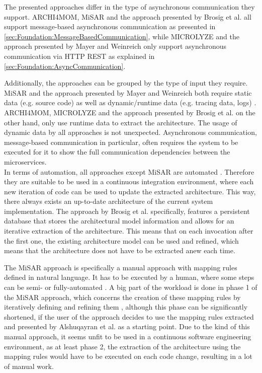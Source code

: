 The presented approaches differ in the type of asynchronous communication they support.
ARCHI4MOM, MiSAR and the approach presented by Brosig et al. all support message-based asynchronous communication as presented in \autoref{sec:Foundation:MessageBasedCommunication}, while MICROLYZE and the approach presented by Mayer and Weinreich only support asynchronous communication via HTTP REST as explained in \autoref{sec:Foundation:AsyncCommunication}.

Additionally, the approaches can be grouped by the type of input they require.
MiSAR and the approach presented by Mayer and Weinreich both require static data (e.g. source code) as well as dynamic/runtime data (e.g. tracing data, logs) \cite{Alshuqayran2018MiSAR,Mayer2018}.
ARCHI4MOM, MICROLYZE and the approach presented by Brosig et al. on the other hand, only use runtime data to extract the architecture.
The usage of dynamic data by all approaches is not unexpected.
Asynchronous communication, message-based communication in particular, often requires the system to be executed for it to show the full communication dependencies between the microservices. %
\\

In terms of automation, all approaches except MiSAR are automated \cite{Singh2022ARCHI4MOM,Brosig2011,Mayer2018,Kleehaus2018}.
Therefore they are suitable to be used in a continuous integration environment, where each new iteration of code can be used to update the extracted architecture.
This way, there always exists an up-to-date architecture of the current system implementation.
The approach by Brosig et al. specifically, features a persistent database that stores the architectural model information \cite{Brosig2011} and allows for an iterative extraction of the architecture.
This means that on each invocation after the first one, the existing architecture model can be used and refined, which means that the architecture does not have to be extracted anew each time.

The MiSAR approach is specifically a manual approach with mapping rules defined in natural language.
It has to be executed by a human, where some steps can be semi- or fully-automated \cite{Alshuqayran2020Thesis}.
A big part of the workload is done in phase 1 of the MiSAR approach, which concerns the creation of these mapping rules by iteratively defining and refining them \cite{Alshuqayran2018MiSAR}, although this phase can be significantly shortened, if the user of the approach decides to use the mapping rules extracted and presented by Alshuqayran et al. as a starting point.
Due to the kind of this manual approach, it seems unfit to be used in a continuous software engineering environment, as at least phase 2, the extraction of the architecture using the mapping rules would have to be executed on each code change, resulting in a lot of manual work.
\\

